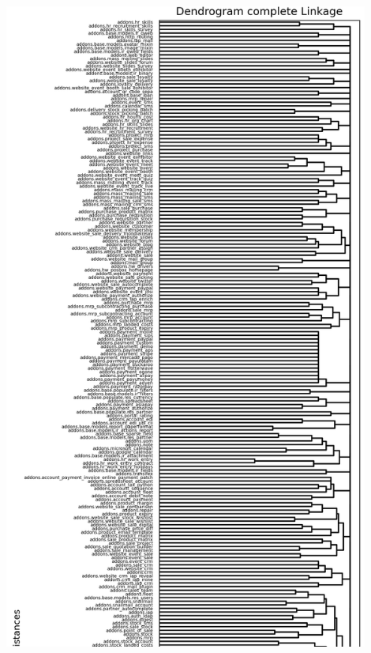\begin{center}
  \includegraphics[width=12cm]{img/lampiran/complete-full-1.png}
  \label{fig:complete-full-1}
\end{center}
\pagebreak
